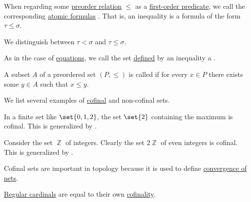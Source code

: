 \begin{definition}\label{def:inequality}\mimprovised
  When regarding some \hyperref[def:preordered_set]{preorder relation} \( \leq \) as a \hyperref[def:first_order_language/pred]{first-order predicate}, we call the corresponding \hyperref[def:first_order_syntax/atomic_formula]{atomic formulas} . That is, an inequality is a formula of the form \( \tau \leq \sigma \).

  We distinguish between  \( \tau < \sigma \) and  \( \tau \leq \sigma \).

  As in the case of \hyperref[def:first_order_equation]{equations}, we call the set \hyperref[def:first_order_definability]{defined} by an inequality a .
\end{definition}

\begin{definition}\label{def:cofinal_set}
  A subset \( A \) of a preordered set \( (P, \leq) \) is called  if for every \( x \in P \) there exists some \( y \in A \) such that \( x \leq y \).
\end{definition}

\begin{example}\label{ex:def:cofinal_set}
  We list several examples of \hyperref[def:cofinal_set]{cofinal} and non-cofinal sets.

  \begin{itemize}
     In a finite set like \( \set{ 0, 1, 2 } \), the set \( \set{ 2 } \) containing the maximum is cofinal. This is generalized by .

     Consider the set \( \BbbZ \) of integers. Clearly the set \( 2\BbbZ \) of even integers is cofinal. This is generalized by .

     Cofinal sets are important in topology because it is used to define \hyperref[def:net_convergence]{convergence of nets}.

     \hyperref[def:regular_cardinal]{Regular cardinals} are equal to their own \hyperref[def:cofinality]{cofinality}.
  \end{itemize}
\end{example}

